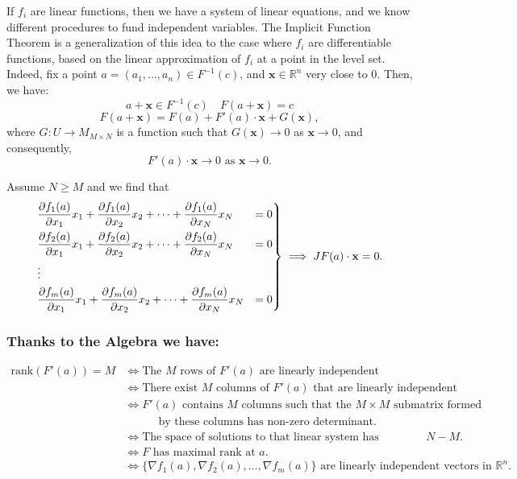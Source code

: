 \documentclass[11pt]{article}
\begin{document}
\begin{remark}
    If \(f_i\) are linear functions, then we have a system of linear equations, and we know different procedures to fund independent variables.
    The Implicit Function Theorem is a generalization of this idea to the case where \(f_i\) are differentiable functions, based on the linear approximation of \(f_i\) at a point in the level set.
    Indeed, fix a point \(a = (a_1, \dots, a_n) \in F^{-1}(c)\), and \(\mathbf{x} \in \mathbb{R}^n\) very close to 0. Then, we have:
    \[a + \mathbf{x} \in F^{-1}(c) \quad F(a + \mathbf{x}) = c\]
    \[F(a + \mathbf{x}) = F(a) + F'(a) \cdot \mathbf{x} + G(\mathbf{x}),\]
    where \(G : U \to M_{M \times N}\) is a function such that \(G(\mathbf{x}) \to 0\) as \(\mathbf{x} \to 0\), and consequently,
    \[F'(a) \cdot \mathbf{x} \to 0 \text{ as } \mathbf{x} \to 0.\]

    Assume \(N \geq M\) and we find that
    \begin{align*}
    \begin{rcases}
        \dfrac{\partial f_1(a)}{\partial x_1} x_1 + \dfrac{\partial f_1(a)}{\partial x_2} x_2 + \cdots + \dfrac{\partial f_1(a)}{\partial x_N} x_N &= 0\\
        \dfrac{\partial f_2(a)}{\partial x_1} x_1 + \dfrac{\partial f_2(a)}{\partial x_2} x_2 + \cdots + \dfrac{\partial f_2(a)}{\partial x_N} x_N &= 0\\
        \vdots \\
        \dfrac{\partial f_m(a)}{\partial x_1} x_1 + \dfrac{\partial f_m(a)}{\partial x_2} x_2 + \cdots + \dfrac{\partial f_m(a)}{\partial x_N} x_N &= 0
    \end{rcases} \implies JF(a) \cdot \mathbf{x} = 0.
    \end{align*}
\end{remark}

\pagebreak
\subsubsection*{Thanks to the Algebra we have:}
\begin{align*}
    \text{rank}(F'(a)) = M & \iff \text{The } M \text{ rows of } F'(a) \text{ are linearly independent} \\
                           & \iff \text{There exist } M \text{ columns of } F'(a) \text{ that are linearly independent} \\
                           & \iff F'(a) \text{ contains } M \text{ columns such that the } M \times M \text{ submatrix formed} \\
                           & \quad \quad \quad\text{by these columns has non-zero determinant}. \\
                           & \iff \text{The space of solutions to that linear system has dimension } N - M. \\
                           & \iff F \text{ has maximal rank at } a. \\
                           & \iff \{\nabla f_1(a), \nabla f_2(a), \dots, \nabla f_m(a)\} \text{ are linearly independent vectors in } \mathbb{R}^n.
\end{align*}
\end{document}
